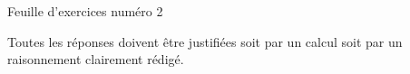 \documentclass[a4paper,12pt]{article}
\begin{document}

\thispagestyle{empty}

\large
\begin{center}
    Feuille d'exercices numéro 2
\end{center}


\tiny
\begin{center}
    Toutes les réponses doivent être justifiées soit par un calcul soit par un raisonnement clairement rédigé.
\end{center}
\normalsize


\end{document}
